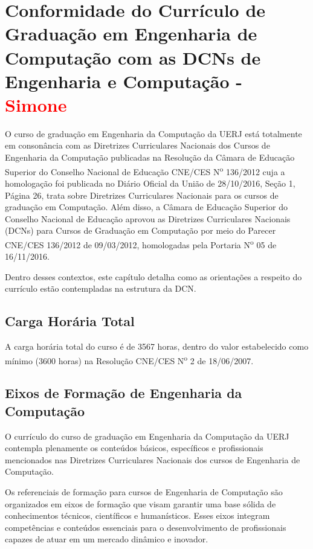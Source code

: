 \chapter{Conformidade do Currículo de Graduação em Engenharia de Computação
  com as DCNs de Engenharia e Computação - \textcolor{red}{Simone}}


O curso de graduação em Engenharia da Computação da UERJ está totalmente em
consonância com as Diretrizes Curriculares Nacionais dos Cursos de Engenharia da Computação publicadas na Resolução da Câmara de Educação Superior do Conselho Nacional de Educação   CNE/CES N\textsuperscript{o}  136/2012 cuja a homologação foi publicada no Diário Oficial da União de 28/10/2016, Seção 1, Página 26, trata sobre Diretrizes Curriculares Nacionais para os cursos de graduação em Computação. Além disso, a Câmara de Educação Superior do Conselho Nacional de Educação aprovou as Diretrizes Curriculares Nacionais (DCNs) para Cursos
de Graduação em Computação por meio do Parecer CNE/CES 136/2012 de 09/03/2012, homologadas pela Portaria N\textsuperscript{o} 05 de 16/11/2016.

Dentro desses contextos, este capítulo detalha como as orientações a respeito do currículo estão contempladas na estrutura da DCN.


\section{Carga Horária Total}

A carga horária total do curso é de 3567 horas, dentro do valor estabelecido como mínimo (3600 horas) na Resolução CNE/CES N\textsuperscript{o} 2 de 18/06/2007.


\section{Eixos de Formação de Engenharia da Computação}

O currículo do curso de graduação em Engenharia da Computação da UERJ contempla plenamente os conteúdos básicos, específicos e profissionais mencionados nas Diretrizes Curriculares Nacionais dos cursos de Engenharia de Computação.

Os referenciais de formação para cursos de Engenharia de Computação são organizados em eixos de formação que visam garantir uma base sólida de conhecimentos técnicos, científicos e humanísticos. Esses eixos integram competências e conteúdos essenciais para o desenvolvimento de profissionais capazes de atuar em um mercado dinâmico e inovador.

